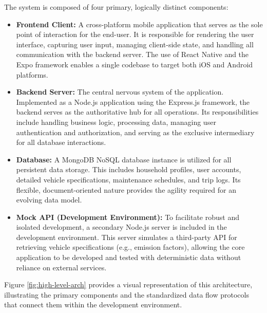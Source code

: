 \textgap

The system is composed of four primary, logically distinct components:
\begin{itemize}
    \item \textbf{Frontend Client:} A cross-platform mobile application that serves as the sole point of interaction for the end-user. It is responsible for rendering the user interface, capturing user input, managing client-side state, and handling all communication with the backend server. The use of React Native and the Expo framework enables a single codebase to target both iOS and Android platforms.
    \textgap
    \item \textbf{Backend Server:} The central nervous system of the application. Implemented as a Node.js application using the Express.js framework, the backend serves as the authoritative hub for all operations. Its responsibilities include handling business logic, processing data, managing user authentication and authorization, and serving as the exclusive intermediary for all database interactions.
    \textgap
    \item \textbf{Database:} A MongoDB NoSQL database instance is utilized for all persistent data storage. This includes household profiles, user accounts, detailed vehicle specifications, maintenance schedules, and trip logs. Its flexible, document-oriented nature provides the agility required for an evolving data model.
    \textgap
    \item \textbf{Mock API (Development Environment):} To facilitate robust and isolated development, a secondary Node.js server is included in the development environment. This server simulates a third-party API for retrieving vehicle specifications (e.g., emission factors), allowing the core application to be developed and tested with deterministic data without reliance on external services.
\end{itemize}

\textgap

Figure \ref{fig:high-level-arch} provides a visual representation of this architecture, illustrating the primary components and the standardized data flow protocols that connect them within the development environment.

